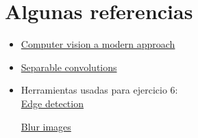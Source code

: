 \documentclass{article}
\begin{document}
\section{Algunas referencias}
\begin{itemize}
\item\href{http://cmuems.com/excap/readings/forsyth-ponce-computer-vision-a-modern-approach.pdf}{Computer vision a modern approach}

\item\href{https://towardsdatascience.com/a-basic-introduction-to-separable-convolutions-b99ec3102728}{Separable convolutions}


\item Herramientas usadas para ejercicio 6:\\
\href{https://pinetools.com/image-edge-detection}{Edge detection}

\href{https://pinetools.com/blur-image}{Blur images}

\end{itemize}
\end{document}
